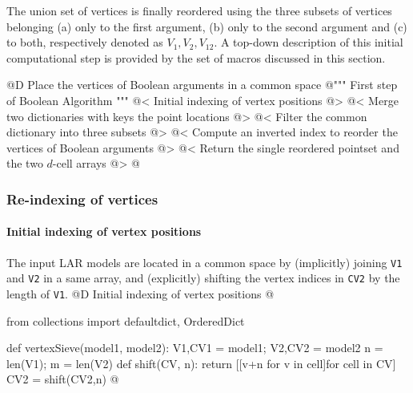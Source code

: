\documentclass[11pt,oneside]{article}	%
\begin{document}
The union set of vertices is finally reordered using the three subsets of vertices belonging (a) only to the first argument, (b) only to the second argument and (c) to both, respectively denoted as $V_1, V_2, V_{12}$. A top-down description of this initial computational step is provided by the set of macros discussed in this section.

@D Place the vertices of Boolean arguments in a common space
@{""" First step of Boolean Algorithm """
@< Initial indexing of vertex positions @>
@< Merge two dictionaries with keys the point locations @>
@< Filter the common dictionary into three subsets @>
@< Compute an inverted index to reorder the vertices of Boolean arguments @>
@< Return the single reordered pointset and the two $d$-cell arrays @>
@}

\subsubsection{Re-indexing of vertices}

\paragraph{Initial indexing of vertex positions}
The input LAR models are located in a common space by (implicitly) joining \texttt{V1} and \texttt{V2} in a same array, and (explicitly) shifting the vertex indices in \texttt{CV2} by the length of \texttt{V1}.
@D Initial indexing of vertex positions
@{from collections import defaultdict, OrderedDict

def vertexSieve(model1, model2):
	V1,CV1 = model1; V2,CV2 = model2
	n = len(V1); m = len(V2)
	def shift(CV, n): 
		return [[v+n for v in cell]for cell in CV]
	CV2 = shift(CV2,n)
@}
\end{document}

